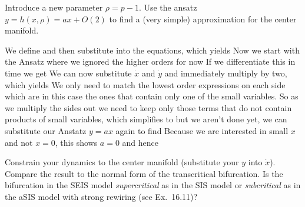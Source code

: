 \subquestion
Introduce a new parameter $\rho=p-1$. Use the ansatz  $y=h(x,\rho) = ax + O(2)$ to find a (very simple) approximation for the center manifold.

\solution 
We define 
and then substitute 
into the equations, which yields
Now we start with the Ansatz 
where we ignored the higher orders for now 
If we differentiate this in time we get 
We can now substitute $\dot{x}$ and $\dot{y}$ and immediately multiply by two, which yields 
We only need to match the lowest order expressions on each side which are in this case the ones that contain only one of the small variables. So as we multiply the sides out we need to keep only those terms that do not contain products of small variables, 
which simplifies to 
but we aren't done yet, we can substitute our Anstatz $y=ax$ again to find 
Because we are interested in small $x$ and not $x=0$, this shows $a=0$ and hence 

\subquestion Constrain your dynamics to the center manifold (substitute your $y$ into $\dot{x}$). Compare the result to the normal form of the transcritical bifurcation. Is the bifurcation in the SEIS model \emph{supercritical} as in the SIS model or \emph{subcritical} as in the aSIS model with strong rewiring (see Ex.~16.11)? 

